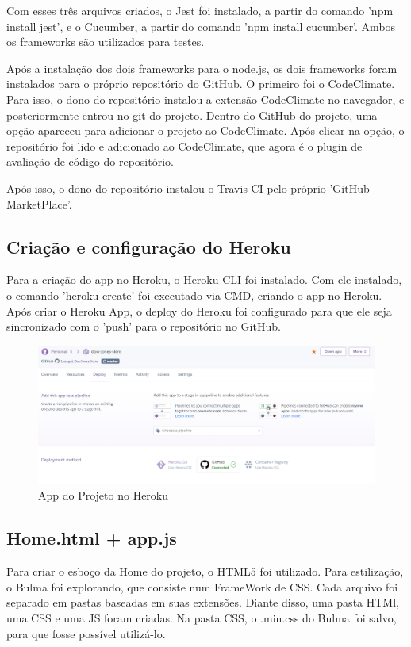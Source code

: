 Com esses três arquivos criados, o Jest foi instalado, a partir do comando 'npm install jest', e o Cucumber, a partir
do comando 'npm install cucumber'. Ambos os frameworks são utilizados para testes.

Após a instalação dos dois frameworks para o node.js, os dois frameworks foram instalados para o próprio repositório do GitHub.
O primeiro foi o CodeClimate. Para isso, o dono do repositório instalou a extensão CodeClimate no navegador,
e posteriormente entrou no git do projeto. Dentro do GitHub do projeto, uma opção apareceu para adicionar
o projeto ao CodeClimate. Após clicar na opção, o repositório foi lido e adicionado ao CodeClimate, 
que agora é o plugin de avaliação de código do repositório.

Após isso, o dono do repositório instalou o Travis CI pelo próprio 'GitHub MarketPlace'.

\subsection{Criação e configuração do Heroku}
Para a criação do app no Heroku, o Heroku CLI foi instalado. Com ele instalado, o comando
'heroku create' foi executado via CMD, criando o app no Heroku. Após criar o Heroku App, o deploy do Heroku foi configurado
para que ele seja sincronizado com o 'push' para o repositório no GitHub.\\
\begin{figure}[!htb]
	\centering
	\includegraphics[scale=0.5]{Imagens/Heroku.png}
	\caption{App do Projeto no Heroku}
\end{figure}

\subsection{Home.html + app.js}
Para criar o esboço da Home do projeto, o HTML5 foi utilizado. Para estilização, o Bulma foi explorando,
que consiste num FrameWork de CSS. Cada arquivo foi separado em pastas baseadas em suas extensões. 
Diante disso, uma pasta HTMl, uma CSS e uma JS foram criadas. Na pasta CSS, o .min.css do Bulma foi salvo, para que fosse possível utilizá-lo.


